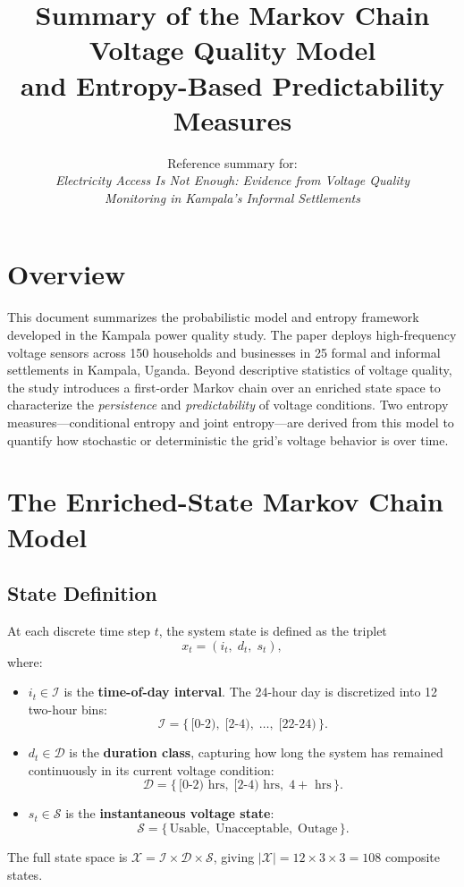 \documentclass[11pt]{article}
\title{Summary of the Markov Chain Voltage Quality Model\\and Entropy-Based Predictability Measures}
\author{Reference summary for:\\
\textit{Electricity Access Is Not Enough: Evidence from Voltage Quality}\\
\textit{Monitoring in Kampala's Informal Settlements}}
\date{}
\begin{document}
\maketitle

\section{Overview}

This document summarizes the probabilistic model and entropy framework developed in the Kampala power quality study. The paper deploys high-frequency voltage sensors across 150 households and businesses in 25 formal and informal settlements in Kampala, Uganda. Beyond descriptive statistics of voltage quality, the study introduces a first-order Markov chain over an enriched state space to characterize the \emph{persistence} and \emph{predictability} of voltage conditions. Two entropy measures---conditional entropy and joint entropy---are derived from this model to quantify how stochastic or deterministic the grid's voltage behavior is over time.

\section{The Enriched-State Markov Chain Model}

\subsection{State Definition}

At each discrete time step $t$, the system state is defined as the triplet
\[
    x_t = (i_t,\; d_t,\; s_t),
\]
where:
\begin{itemize}
    \item $i_t \in \mathcal{I}$ is the \textbf{time-of-day interval}. The 24-hour day is discretized into 12 two-hour bins:
    \[
        \mathcal{I} = \bigl\{\, [0\text{-}2),\; [2\text{-}4),\; \ldots,\; [22\text{-}24) \,\bigr\}.
    \]
    \item $d_t \in \mathcal{D}$ is the \textbf{duration class}, capturing how long the system has remained continuously in its current voltage condition:
    \[
        \mathcal{D} = \bigl\{\, [0\text{-}2)\text{ hrs},\; [2\text{-}4)\text{ hrs},\; 4{+}\text{ hrs} \,\bigr\}.
    \]
    \item $s_t \in \mathcal{S}$ is the \textbf{instantaneous voltage state}:
    \[
        \mathcal{S} = \bigl\{\, \text{Usable},\; \text{Unacceptable},\; \text{Outage} \,\bigr\}.
    \]
\end{itemize}
The full state space is $\mathcal{X} = \mathcal{I} \times \mathcal{D} \times \mathcal{S}$, giving $|\mathcal{X}| = 12 \times 3 \times 3 = 108$ composite states.
\end{document}
